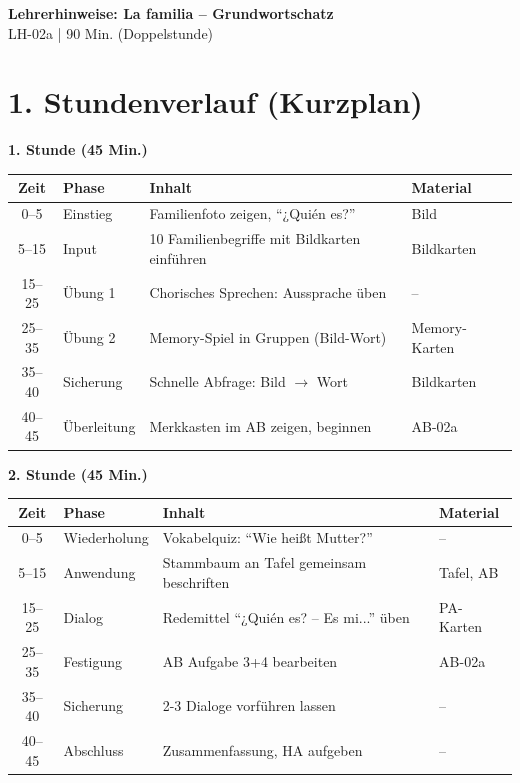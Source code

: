 \documentclass[11pt, a4paper]{article}
\newcommand{\fachfarbe}{spanisch}
\newcommand{\thema}{La familia -- Grundwortschatz}
\newcommand{\sequenz}{02}
\newcommand{\block}{a}
\newcommand{\dauer}{90 Min. (Doppelstunde)}
\begin{document}
\begin{center}
    {\Large\bfseries\textcolor{\fachfarbe}{Lehrerhinweise: \thema}}\\[0.3em]
    {\normalsize LH-\sequenz\block{} | \dauer}
\end{center}

\vspace{10pt}


\section*{1. Stundenverlauf (Kurzplan)}

\textbf{1. Stunde (45 Min.)}

\begin{tabularx}{\textwidth}{|c|l|X|l|}
\hline
\textbf{Zeit} & \textbf{Phase} & \textbf{Inhalt} & \textbf{Material} \\
\hline
0--5 & Einstieg & Familienfoto zeigen, ``¿Quién es?'' & Bild \\
\hline
5--15 & Input & 10 Familienbegriffe mit Bildkarten einführen & Bildkarten \\
\hline
15--25 & Übung 1 & Chorisches Sprechen: Aussprache üben & -- \\
\hline
25--35 & Übung 2 & Memory-Spiel in Gruppen (Bild-Wort) & Memory-Karten \\
\hline
35--40 & Sicherung & Schnelle Abfrage: Bild $\rightarrow$ Wort & Bildkarten \\
\hline
40--45 & Überleitung & Merkkasten im AB zeigen, beginnen & AB-02a \\
\hline
\end{tabularx}

\vspace{1em}

\textbf{2. Stunde (45 Min.)}

\begin{tabularx}{\textwidth}{|c|l|X|l|}
\hline
\textbf{Zeit} & \textbf{Phase} & \textbf{Inhalt} & \textbf{Material} \\
\hline
0--5 & Wiederholung & Vokabelquiz: ``Wie heißt Mutter?'' & -- \\
\hline
5--15 & Anwendung & Stammbaum an Tafel gemeinsam beschriften & Tafel, AB \\
\hline
15--25 & Dialog & Redemittel ``¿Quién es? -- Es mi...'' üben & PA-Karten \\
\hline
25--35 & Festigung & AB Aufgabe 3+4 bearbeiten & AB-02a \\
\hline
35--40 & Sicherung & 2-3 Dialoge vorführen lassen & -- \\
\hline
40--45 & Abschluss & Zusammenfassung, HA aufgeben & -- \\
\hline
\end{tabularx}
\end{document}

